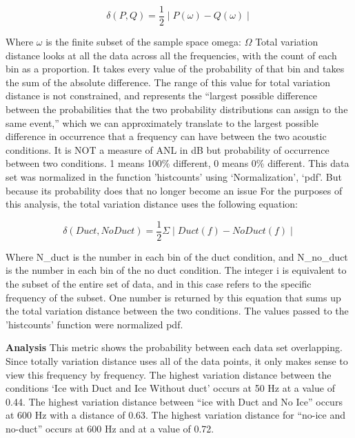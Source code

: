 \begin{equation} \label{eq:finitetotvar}
\delta(P,Q)=\frac{1}{2}\mid P(\omega)-Q(\omega) \mid 
\end{equation}

Where $\omega$ is the finite subset of the sample space omega: $\Omega$
Total variation distance looks at all the data across all the frequencies, with the count of each bin as a proportion. It takes every value of the probability of that bin and takes the sum of the absolute difference. The range of this value for total variation distance is not constrained, and represents the “largest possible difference between the probabilities that the two probability distributions can assign to the same event,” which we can approximately translate to the largest possible difference in occurrence that a frequency can have between the two acoustic conditions. It is NOT a measure of ANL in dB but probability of occurrence between two conditions. 1 means 100\% different, 0 means 0\% different.
This data set was normalized in the function 'histcounts' using ‘Normalization’, ‘pdf’. But because its probability does that no longer become an issue
For the purposes of this analysis, the total variation distance uses the following equation: 

\begin{equation} \label{eq:actualtotvar}
\delta(Duct, No Duct)=\frac{1}{2} \Sigma \mid Duct(f) - No Duct(f) \mid 
\end{equation}

Where N\_duct is the number in each bin of the duct condition, and N\_no\_duct is the number in each bin of the no duct condition. The integer i is equivalent to the subset of the entire set of data, and in this case refers to the specific frequency of the subset. One number is returned by this equation that sums up the total variation distance between the two conditions. The values passed to the 'histcounts' function were normalized pdf.


\textbf{Analysis}
This metric shows the probability between each data set overlapping. Since totally variation distance uses all of the data points, it only makes sense to view this frequency by frequency. The highest variation distance between the conditions ‘Ice with Duct and Ice Without duct’ occurs at 50 Hz at a value of 0.44. The highest variation distance between “ice with Duct and No Ice” occurs at 600 Hz with a distance of 0.63. The highest variation distance for “no-ice and no-duct” occurs at 600 Hz and at a value of 0.72. 


